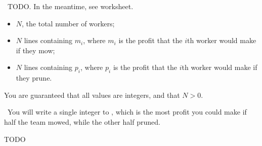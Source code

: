 
\Question\ TODO. In the meantime, see worksheet.

\Input

\begin{itemize}
    \item $N$, the total number of workers;
    \item $N$ lines containing $m_i$, where $m_i$ is the profit that the $i$th worker would make if they mow;
    \item $N$ lines containing $p_i$, where $p_i$ is the profit that the $i$th worker would make if they prune.
\end{itemize}

You are guaranteed that all values are integers, and that $N > 0$.

\Output\ You will write a single integer to \OUT, which is the most profit you could
make if half the team mowed, while the other half pruned.

\Sample


\Explanation TODO